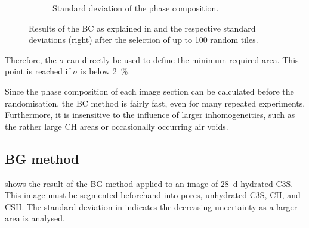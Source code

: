 \begin{figure}[H]
\begin{subfigure}[t]{0.49\linewidth}
      \caption{Standard deviation of the phase composition.}
      \label{fig:lit_box_count_b}
    \end{subfigure}
    \caption{
        Results of the \ac{BC} as explained in \cite{mouret.2001,hlavacek.2015} and the respective standard deviations (right) after the selection of up to \num{100} random tiles.
    }
    \label{fig:lit_box_count}
\end{figure}

Therefore, the $\sigma$ can directly be used to define the minimum required area.
This point is reached if $\sigma$ is below \qty{2}{\percent}.

Since the phase composition of each image section can be calculated before the randomisation, the \ac{BC} method is fairly fast, even for many repeated experiments.
Furthermore, it is insensitive to the influence of larger inhomogeneities, such as the rather large \ac{CH} areas or occasionally occurring air voids.


\subsection{\Acl*{BG} method}

 shows the result of the \ac{BG} method applied to an image of \qty{28}{\day} hydrated \ac{C3S}.
This image must be segmented beforehand into pores, unhydrated \ac{C3S}, \ac{CH}, and \ac{CSH}.
The standard deviation in  indicates the decreasing uncertainty as a larger area is analysed.

